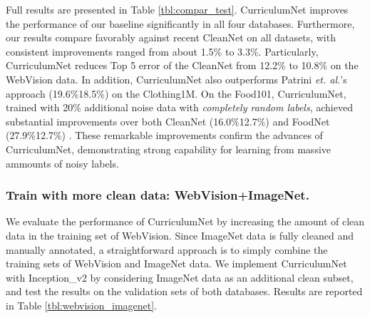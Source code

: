 \documentclass[runningheads]{llncs}
\begin{document}
Full results are presented in Table \ref{tbl:compar_test}. CurriculumNet improves the performance of our baseline significantly in all four databases. Furthermore, our results compare favorably against recent CleanNet on all datasets, with consistent improvements ranged from about 1.5\% to 3.3\%. Particularly, CurriculumNet reduces Top 5 error of the CleanNet from 12.2\% to 10.8\% on the WebVision data. In addition, CurriculumNet also outperforms Patrini \emph{et. al.}'s approach (19.6\%18.5\%) \cite{Patrini2017} on the Clothing1M. On the Food101, CurriculumNet, trained with 20\% additional noise data with \emph{completely random labels}, achieved substantial improvements over both CleanNet (16.0\%12.7\%) and FoodNet (27.9\%12.7\%) \cite{pandey2017foodnet}. These remarkable improvements confirm the advances of CurriculumNet, demonstrating strong capability for learning from massive ammounts of noisy labels.

\subsubsection{Train with more clean data: WebVision+ImageNet.}
We evaluate the performance of CurriculumNet by increasing the amount of clean data in the training set of WebVision. Since ImageNet data is fully cleaned and manually annotated, a straightforward approach is to simply combine the training sets of WebVision and ImageNet data. We implement CurriculumNet with Inception\_v2 by considering ImageNet data as an additional clean subset, and test the results on the validation sets of both databases. Results are reported in Table \ref{tbl:webvision_imagenet}.
\end{document}
